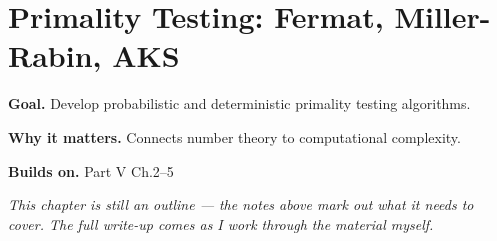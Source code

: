\chapter{Primality Testing: Fermat, Miller-Rabin, AKS}
\label{ch:05-number-theory-06}

\begin{chapterintro}
\textbf{Goal.} Develop probabilistic and deterministic primality testing algorithms.

\textbf{Why it matters.} Connects number theory to computational complexity.

\textbf{Builds on.} Part V Ch.2–5
\end{chapterintro}

\textit{This chapter is still an outline --- the notes above mark out what it needs to cover. The full write-up comes as I work through the material myself.}
